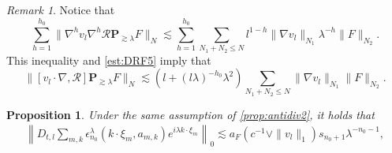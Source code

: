 \documentclass[10pt,a4paper]{amsart}
\numberwithin{equation}{section}
\numberwithin{corollario}{section}
\numberwithin{lemma}{section}
\newtheorem{prop}{Proposition}
\numberwithin{prop}{section}
\theoremstyle{definition}
\theoremstyle{remark}
\newtheorem{oss}[thm]{Remark}
\newcommand{\proj}{\mathbf{P}}
\begin{document}
\begin{oss}\label{oss:postAntidiv}
    Notice that 
    \begin{equation}
     \sum_{h=1}^{h_0}\|\nabla^hv_l\nabla^h\mathcal{R}\proj_{\gtrsim\lambda}F\|_N\lesssim \sum_{h=1}^{h_0}\sum_{N_1+N_2\le N}l^{1-h}\|\nabla v_l\|_{N_1}\lambda^{-h}\|F\|_{N_2}.   
    \end{equation}
    This inequality and \eqref{est:DRF5} imply that
    \begin{equation}
        \|[v_l\cdot\nabla,\mathcal{R}]\proj_{\gtrsim \lambda}F\|_N\lesssim (l+(l\lambda)^{-h_0}\lambda^2)\sum_{N_1+N_2\le N}\|\nabla v_l\|_{N_1}\|F\|_{N_2}.
    \end{equation}
\end{oss}
\begin{prop}
    Under the same assumption of  \autoref{prop:antidiv2}, it holds that
    \begin{align}
        \label{e:Antidiv3}
        \left\|D_{t,l}\sum_{m,k}\epsilon^{\lambda}_{n_0}(k\cdot \xi_m,a_{m,k})e^{i\lambda k\cdot \xi_m}\right\|_0
        \lesssim 
        a_F(c^{-1}\vee \|v_l\|_1)s_{n_0+1}\lambda^{-n_0-1},
    \end{align}
\end{prop}
\end{document}
